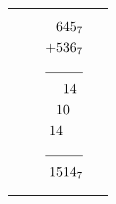 \begin{zad}
\begin{tabular}{ p{3cm} p{3cm} p{3cm} }
{\begin{align*}
        \end{align*}}

        &

        {\begin{align*}

            6&45_7 \\

         +  5&36_7 \\

         \cline{1-2}

            &14 \\

            1&0 \\

            14& \\ 

        \cline{1-2}

            15&14_7

        \end{align*}}

        \end{tabular}

    \end{zad}

